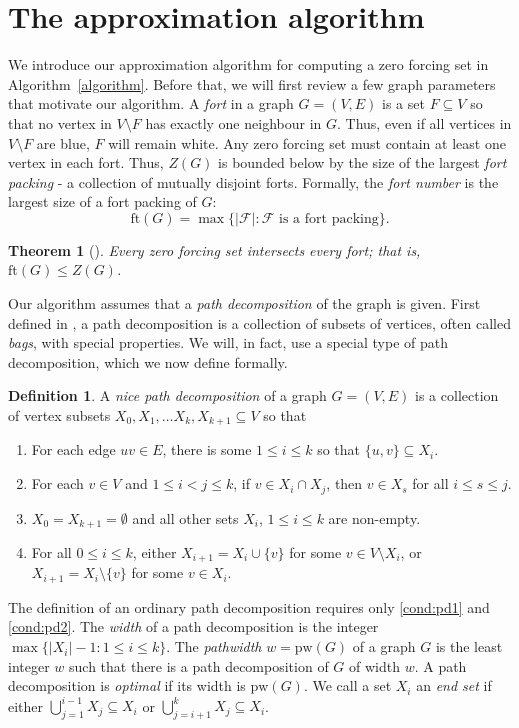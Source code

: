 \documentclass[12pt]{amsart}
\theoremstyle{plain}
\newtheorem{theorem}{Theorem}[section]
\theoremstyle{definition}
\newtheorem{definition}{Definition}[section]
\def\calF{\mathcal{F}}
\def\ft{\mathrm{ft}}
\def\pw{\mathrm{pw}}
\renewcommand{\subset}{\subseteq}
\begin{document}
\section{The approximation algorithm}\label{sec:approxalg}
We introduce our approximation algorithm for computing a zero forcing set in Algorithm~\ref{algorithm}. Before that, we will first review a few graph parameters that motivate our algorithm. 
A \emph{fort} in a graph $G=(V, E)$ is a set $F\subset V$ so that no vertex in $V\setminus F$ has exactly one neighbour in $G$. Thus, even if all vertices in $V\setminus F$ are blue, $F$ will remain white. Any zero forcing set must contain at least one vertex in each fort. 
Thus, $Z(G)$ is bounded below by the size of the largest \emph{fort packing} - a collection of mutually disjoint forts. 
Formally, the {\em fort number} is the largest size of a fort packing of $G$: 
$$\ft(G) = \max\{|\calF|: \calF \text{ is a fort packing}\}.$$
\begin{theorem}[\cite{fast2018effects}] 
Every zero forcing set intersects every fort; that is, $\ft(G)\leq Z(G)$. 
\end{theorem}




Our algorithm assumes that a {\sl path decomposition} of the graph is given. 
First defined in \cite{robertson1986graph}, a path decomposition is a collection of subsets of vertices, often called {\sl bags}, with special properties. 
We will, in fact, use a special type of path decomposition, which we now define formally.


\begin{definition}
    A \emph{nice path decomposition} of a graph $G=(V,E)$ is a collection of vertex subsets $X_0,X_1,\dots X_k, X_{k+1}\subset V$ so that
    \begin{enumerate}[label=(D\arabic*)]
        \item\label{cond:pd1} For each edge $uv\in E$, there is some $1\leq i\leq k$ so that $\{u,v\}\subseteq X_i$.
        \item\label{cond:pd2} For each $v\in V$ and $1\leq i<j\leq k$, if $v\in X_i\cap X_j$, then $v\in X_s$ for all $i\leq s\leq j$.
        \item\label{cond: spd-start-end} $X_0=X_{k+1}=\emptyset$ and all other sets $X_i$, $1\leq i\leq k$ are non-empty.
        \item\label{cond: spd-set difference} For all $0\leq i\leq k$, either $X_{i+1}=X_i\cup \{v\}$ for some $v\in V\setminus X_i$, or $X_{i+1}=X_i\setminus \{v\}$ for some $v\in X_i$.
    \end{enumerate}
The definition of an ordinary path decomposition requires only \ref{cond:pd1} and \ref{cond:pd2}.
The {\em width} of a path decomposition is the integer $\max\{|X_i| - 1:1\leq i\leq k\}$. 
The {\em pathwidth} $w = \pw(G)$ of a graph $G$ is the least integer $w$ such that there is a path decomposition of $G$ of width $w$. 
A path decomposition is {\em optimal} if its width is $\pw(G)$.
We call a set $X_i$ an \emph{end set} if either $\bigcup_{j=1}^{i-1}X_j\subseteq X_i$ or $\bigcup_{j=i+1}^k X_j\subseteq X_i$.
\end{definition}
\end{document}

